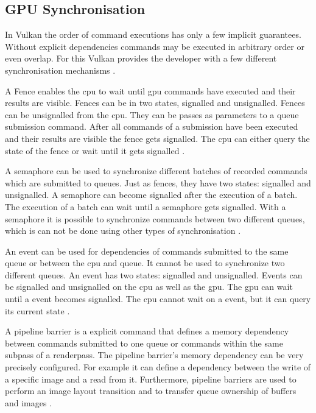 \subsection{GPU Synchronisation}
\label{section:synchronisation}
In Vulkan the order of command executions has only a few implicit guarantees. Without explicit dependencies commands may be executed in arbitrary order or even overlap. For this Vulkan provides the developer with a few different synchronisation mechanisms \cite{khronos:vulkan:spec1.1}.

A Fence enables the \gls{cpu} to wait until \gls{gpu} commands have executed and their results are visible. Fences can be in two states, signalled and unsignalled. Fences can be unsignalled from the \gls{cpu}. They can be passes as parameters to a queue submission command. After all commands of a submission have been executed and their results are visible the fence gets signalled. The \gls{cpu} can either query the state of the fence or wait until it gets signalled \cite{khronos:vulkan:spec1.1}.

A semaphore can be used to synchronize different batches of recorded commands  which are submitted to queues. Just as fences, they have two states: signalled and unsignalled. A semaphore can become signalled after the execution of a batch. The execution of a batch can wait until a semaphore gets signalled. With a semaphore it is possible to synchronize commands between two different queues, which is can not be done using other types of synchronisation \cite{khronos:vulkan:spec1.1}.

An event can be used for dependencies of commands submitted to the same queue or between the \gls{cpu} and queue. It cannot be used to synchronize two different queues. An event has two states: signalled and unsignalled. Events can be signalled and unsignalled on the \gls{cpu} as well as the \gls{gpu}. The \gls{gpu} can wait until a event becomes signalled. The \gls{cpu} cannot wait on a event, but it can query its current state \cite{khronos:vulkan:spec1.1}.

A pipeline barrier is a explicit command that defines a memory dependency between commands submitted to one queue or commands within the same subpass of a renderpass. The pipeline barrier's memory dependency can be very precisely configured. For example it can define a dependency between the write of a specific image and a read from it. Furthermore, pipeline barriers are used to perform an image layout transition and to transfer queue ownership of buffers and images \cite{khronos:vulkan:spec1.1}.

